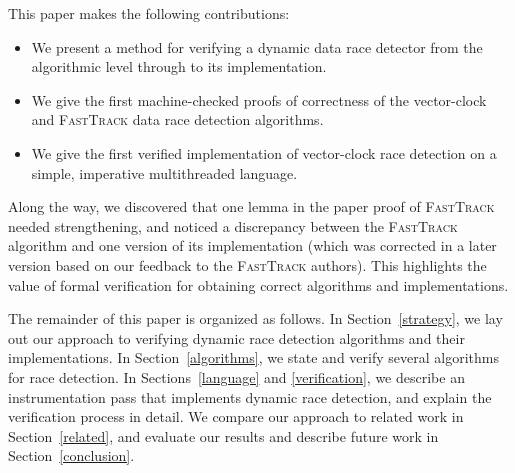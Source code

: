 \documentclass[preprint, 10pt]{sigplanconf}
\newcommand{\ignore}[1]{}
\newcommand{\FT}{\textsc{FastTrack}\xspace}
\begin{document}
This paper makes the following contributions:
\begin{itemize}
\item We present a method for verifying a dynamic data race detector from the algorithmic level through to its implementation.
\item We give the first machine-checked proofs of correctness of the vector-clock and \FT data race detection algorithms.
\item We give the first verified implementation of vector-clock race detection on a simple, imperative multithreaded language.
\ignore{\item We uncover issues in the paper proof of correctness for \FT and in its current implementation that are unlikely to have been revealed without our verification efforts. We repair these issues in our own proofs and implementation.}
\end{itemize}
Along the way, we discovered that one lemma in the paper proof of \FT needed strengthening, and noticed a discrepancy between the \FT algorithm and one version of its implementation (which was corrected in a later version based on our feedback to the \FT authors). This highlights the value of formal verification for obtaining correct algorithms and implementations.

The remainder of this paper is organized as follows. In Section~\ref{strategy}, we lay out our approach to verifying dynamic race detection algorithms and their implementations. In Section~\ref{algorithms}, we state and verify several algorithms for race detection. In Sections~\ref{language} and \ref{verification}, we describe an instrumentation pass that implements dynamic race detection, and explain the verification process in detail. We compare our approach to related work in Section~\ref{related}, and evaluate our results and describe future work in Section~\ref{conclusion}.
\end{document}
